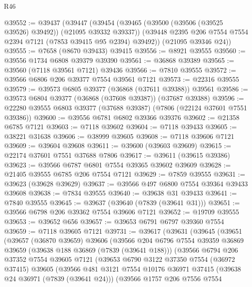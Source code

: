 \begin{lexlean}{R46}
\begin{coremodule}
@39552 := @39437
    (@39447
      (@39454
        (@39465 (@39500 (@39506 (@39525 @39526) @39492)) (@21095 @39332 @39337))
        (@39448 @2395 @206 @7554 @7554 @2394 @7121 (@7853 @39415 @95 @2394) @39492))
      (@21095 @39346 @24))
@39555 := @7658 (@8670 @39433) @39415
@39556 := @8921 @39555
@39560 := @39556 @1734 @6808 @39379 @39390
@39561 := @36868 @39389
@39565 := @39560 (@7118 @39561 @7121) @39436
@39566 := @7810 @39555
@39572 := @39566 @6806 @206 @39377 @7554 @39561 @7121
@39573 := @22316 @39555
@39579 := @39573 @6805 @39377 (@36868 (@37611 @39388)) @39561
@39586 := @39573 @6804 @39377 (@36868 (@37608 @39387)) (@37687 @39388)
@39596 := @22280 @39555 @6803 @39377 (@37688 @39387) (@7806 (@22124 @37601 @7551 @39386))
@39600 := @39556 @6781 @6802 @39366 @39376
@39602 := @21358 @6785 @7121
@39603 := @7118 @39602
@39604 := @7118 @39433
@39605 := @38221 @31638
@39606 := @38999 @39605
@39608 := @7118 @39606 @7121
@39609 := @39604 @39608
@39611 := @39600 (@39603 @39609)
@39615 := @22174 @37601 @7551 @37688 @7806
@39617 := @39611 (@39615 @39386)
@39623 := @39566 @6787 @6801 @7554 @39365 @39602 @39609
@39628 := @21405 @39555 @6785 @206 @7554 @7121
@39629 := @7859 @39555
@39631 := @39623 (@39628 @39629)
@39637 := @39566 @497 @6800 @7554 @39364 @39433 @39608
@39638 := @7834 @39555
@39640 := @39638 @31 @39433
@39641 := @7840 @39555
@39645 := @39637 (@39640 (@7839 (@39641 @31)))
@39651 := @39566 @6798 @206 @39362 @7554 @39606 @7121
@39652 := @19709 @39555
@39653 := @39652 @656
@39657 := @39653 @6791 @6797 @39360 @7554
@39659 := @7118 @39605 @7121
@39731 := @39617
    (@39631
      (@39645
        (@39651
          (@39657
            (@36870 @39659)
            @39606
            (@39566
              @204
              @6796
              @7554
              @39359
              @36869
              @39659
              (@39638 @188 @36869 (@7839 (@39641 @188)))
              (@39566
                @6794
                @206
                @37352
                @7554
                @39605
                @7121
                (@39653
                  @6790
                  @3122
                  @37350
                  @7554
                  (@36972 @37415)
                  @39605
                  (@39566
                    @481
                    @3121
                    @7554
                    @10176
                    @36971
                    @37415
                    (@39638 @24 @36971 (@7839 (@39641 @24)))
                    (@39566
                      @1757
                      @206
                      @7556
                      @7554

\end{coremodule}
\end{lexlean}
